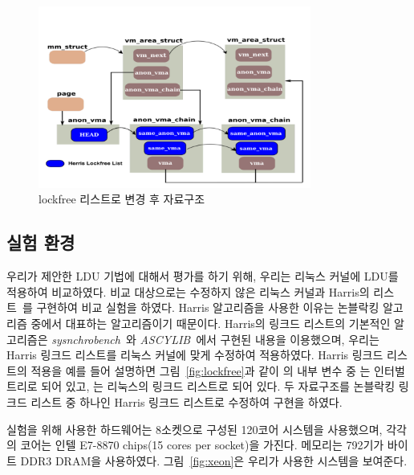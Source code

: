 \begin{figure}[h]
    \centering
    \includegraphics[width=0.8\textwidth]{fig/lockfree_2}
    \caption{lockfree 리스트로 변경 후 자료구조}
  \label{fig:lockfree_2}
\end{figure}

\subsection{실험 환경}

우리가 제안한 LDU 기법에 대해서 평가를 하기 위해, 우리는 리눅스 커널에 LDU를 적용하여 비교하였다.
비교 대상으로는 수정하지 않은 리눅스 커널과 Harris의  리스트~\cite{Harris2001Lockfree}를 
구현하여 비교 실험을 하였다.
Harris 알고리즘을 사용한 이유는 논블락킹 알고리즘 중에서 대표하는 알고리즘이기 때문이다. 
Harris의 링크드 리스트의 기본적인 알고리즘은
\textit{sysnchrobench}~\cite{Gramoli2015Synchrobench}와
\textit{ASCYLIB}~\cite{David2015ASYNCHRONIZED}에서 구현된 내용을 이용했으며, 우리는 Harris 링크드
리스트를 리눅스 커널에 맞게 수정하여 적용하였다.
Harris 링크드 리스트의 적용을 예를 들어 설명하면 그림~\ref{fig:lockfree}과 같이 
의 내부 변수 중 는 인터벌 트리로 되어 있고, 
는 리눅스의 링크드 리스트로 되어 있다. 
두 자료구조를 논블락킹 링크드 리스트 중 하나인 Harris 링크드 리스트로 수정하여 구현을 하였다.

실험을 위해 사용한 하드웨어는 8소켓으로 구성된 120코어 시스템을 사용했으며,
각각의 코어는 인텔 E7-8870 chips(15 cores per socket)을 가진다.
메모리는 792기가 바이트 DDR3 DRAM을 사용하였다.
그림~\ref{fig:xeon}은 우리가 사용한 시스템을 보여준다.

